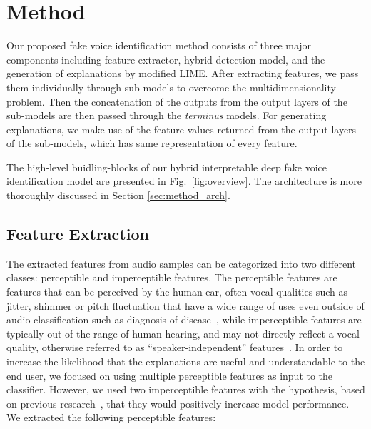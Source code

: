 \documentclass{article}
\begin{document}
\section{Method}\label{sec:method}
Our proposed fake voice identification method consists of three major components including feature extractor, hybrid detection model, and the generation of explanations by modified LIME. After extracting features, we pass them individually through sub-models to overcome the multidimensionality problem. Then the concatenation of the outputs from the output layers of the sub-models are then passed through the \textit{terminus} models. For generating explanations, we make use of the feature values returned from the output layers of the sub-models, which has same representation of every feature. 

The high-level buidling-blocks of our hybrid interpretable deep fake voice identification model are presented in Fig.~\ref{fig:overview}. The architecture is more thoroughly discussed in Section \ref{sec:method_arch}.

\subsection{Feature Extraction}
The extracted features from audio samples can be categorized into two different classes: perceptible and imperceptible features. The perceptible features are features that can be perceived by the human ear, often vocal qualities such as jitter, shimmer or pitch fluctuation that have a wide range of uses even outside of audio classification such as diagnosis of disease~\cite{chaiwongyen_deepfake-speech_2023}, while imperceptible features are typically out of the range of human hearing, and may not directly reflect a vocal quality, otherwise referred to as ``speaker-independent'' features~\cite{liu_hidden--wave_2023}. In order to increase the likelihood that the explanations are useful and understandable to the end user, we focused on using multiple perceptible features as input to the classifier. However, we used two imperceptible features with the hypothesis, based on previous research~\cite{barrington_single_2023,chaiwongyen_contribution_2022,chaiwongyen_deepfake-speech_2023,li_comparative_2022}, that they would positively increase model performance. We extracted the following perceptible features:
\end{document}

